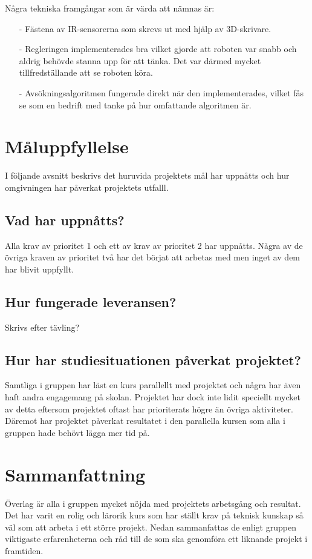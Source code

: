 \documentclass[11pt]{article}
\begin{document}
Några tekniska framgångar som är värda att nämnas är:
\begin{itemize}
  \item[-] Fästena av IR-sensorerna som skrevs ut med hjälp av 3D-skrivare.
  \item[-] Regleringen implementerades bra vilket gjorde att roboten var snabb och aldrig behövde stanna upp för att tänka. Det var därmed mycket tillfredställande att se roboten köra. 
  \item[-] Avsökningsalgoritmen fungerade direkt när den implementerades, vilket fås se som en bedrift med tanke på hur omfattande algoritmen är. 
\end{itemize} 

\pagebreak

\section{Måluppfyllelse}
I följande avsnitt beskrivs det huruvida projektets mål har uppnåtts och hur omgivningen har påverkat projektets utfalll.

\subsection{Vad har uppnåtts?}
Alla krav av prioritet 1 och ett av krav av prioritet 2 har uppnåtts. Några av de övriga kraven av prioritet två har det börjat att arbetas med men inget av dem har blivit uppfyllt.

\subsection{Hur fungerade leveransen?}
Skrivs efter tävling?

\subsection{Hur har studiesituationen påverkat projektet?}
Samtliga i gruppen har läst en kurs parallellt med projektet och några har även haft andra engagemang på skolan. Projektet har dock inte lidit speciellt mycket av detta eftersom projektet oftast har prioriterats högre än övriga aktiviteter. Däremot har projektet påverkat resultatet i den parallella kursen som alla i gruppen hade behövt lägga mer tid på. 

 \pagebreak 

\section{Sammanfattning}
Överlag är alla i gruppen mycket nöjda med projektets arbetsgång och resultat. Det har varit en rolig och lärorik kurs som har ställt krav på teknisk kunskap så väl som att arbeta i ett större projekt. Nedan sammanfattas de enligt gruppen viktigaste erfarenheterna och råd till de som ska genomföra ett liknande projekt i framtiden.
\end{document}

